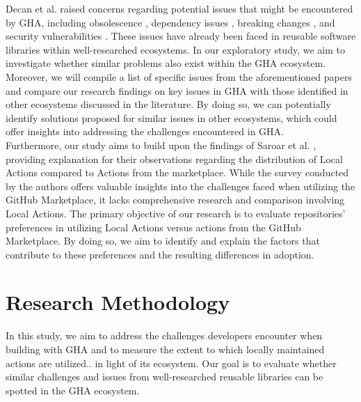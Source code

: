 \documentclass[conference]{IEEEtran}
\begin{document}
	Decan et al. \cite{decan2022use} raised concerns regarding potential issues that might be encountered by GHA, including obsolescence \cite{decan2018evolution} \cite{cogo2021deprecation}, dependency issues \cite{decan2019empirical} \cite{soto2021comprehensive} \cite{decan2019package}, breaking changes \cite{dietrich2019dependency} \cite{decan2018impact}, and security vulnerabilities \cite{zimmermann2019small} \cite{kula2018developers}. These issues have already been faced in reusable software libraries within well-researched ecosystems. In our exploratory study, we aim to investigate whether similar problems also exist within the GHA ecosystem. Moreover, we will compile a list of specific issues from the aforementioned papers and compare our research findings on key issues in GHA with those identified in other ecosystems discussed in the literature. By doing so, we can potentially identify solutions proposed for similar issues in other ecosystems, which could offer insights into addressing the challenges encountered in GHA.\\
	Furthermore, our study aims to build upon the findings of Saroar et al. \cite{saroar2023developers}, providing explanation for their observations regarding the distribution of Local Actions compared to Actions from the marketplace. While the survey conducted by the authors offers valuable insights into the challenges faced when utilizing the GitHub Marketplace, it lacks comprehensive research and comparison involving Local Actions. The primary objective of our research is to evaluate repositories' preferences in utilizing Local Actions versus actions from the GitHub Marketplace. By doing so, we aim to identify and explain the factors that contribute to these preferences and the resulting differences in adoption.




\section{Research Methodology}
    In this study, we aim to address the challenges developers encounter when building with GHA and to measure the extent to which locally maintained actions are utilized.. in light of its ecosystem. Our goal is to evaluate whether similar challenges and issues from well-researched reusable libraries can be spotted in the GHA ecosystem.\\
\end{document}
